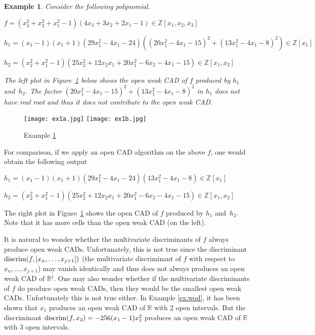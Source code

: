 \documentclass[amsthm]{elsart}
\def \RR {{\mathbb R}}
\def \ZZ {{\mathbb Z}}
\newtheorem{ex}{Example}   \renewcommand{\algorithmicrequire}{\textsf{Input:}}
\begin{document}
\begin{ex}\label{ex:1}
Consider the following polynomial. \medskip
\begin{description}[leftmargin=3em,style=nextline,itemsep=0.5em]
\item[\sf In:]   $f=(x_3^2+x_2^2+x_1^2-1)(4x_3+3x_2+2x_1-1)\in \ZZ[x_1, x_2,x_3]$
\item[\sf Out:]  $h_1 =(x_1-1)(x_1+1)(29x_1^2-4x_1-24)((20x_1^2-4x_1-15)^2+(13x_1^2-4x_1-8)^2)\in \ZZ[x_1]$
\item[]             $h_2 =(x_2^2+x_1^2-1)(25x_2^2+12x_2x_1+20x_1^2-6x_2-4x_1-15)\in \ZZ[x_1, x_2] $
\end{description} \medskip
The left plot in Figure~\ref{fig:ex1ab} below shows the open weak CAD of $f$  produced by $h_1$ and~$h_2$.
The factor $(20x_1^2-4x_1-15)^2+(13x_1^2-4x_1-8)^2$ in $h_1$ does not have real root and thus it does not contribute to the open weak CAD.
\end{ex}
\begin{figure}[h]
\begin{center}
\texttt{[image: ex1a.jpg]}
\texttt{[image: ex1b.jpg]}
\end{center}
\caption{\label{fig:ex1ab}Example \ref{ex:1} }
\end{figure}


\begin{rem} For comparison, if we apply an open CAD  algorithm on the above $f$, one would obtain the following
output\medskip
\begin{description}[leftmargin=3em,style=nextline,itemsep=0.5em]
\item[\sf Out:]  $h_1=(x_1-1)(x_1+1)(29x_1^2-4x_1-24)(13x_1^2-4x_1-8)\in \ZZ[x_1]$
\item[]          $h_2 =(x_2^2+x_1^2-1)(25x_2^2+12x_2x_1+20x_1^2-6x_2-4x_1-15)\in \ZZ[x_1, x_2]$
\end{description}  \medskip
The right plot in Figure~\ref{fig:ex1ab} shows the open  CAD of $f$  produced by $h_1$ and~$h_2$.
Note that it has more cells than the open weak CAD (on the left).
\end{rem}


\begin{rem}
It is natural to wonder whether the multivariate discriminants of $f$ always produce open weak CADs. Unfortunately, this is not true since the discriminant ${\rm discrim}(f,[x_n,\ldots,x_{j+1}])$ (the multivariate discriminant of $f$ with respect to $x_n,\ldots,x_{j+1}$) may vanish identically and thus does not always produces an open weak CAD of $\RR^j$.
One may also wonder whether if the multivariate discriminants of $f$ do produce open weak CADs, then they would be the smallest open weak CADs. Unfortunately this is not true  either. In Example \ref{ex:wod}, it has been shown that $x_1$ produces an open weak CAD of $\RR$ with $2$ open intervals. But the discriminant ${\rm discrim}(f,x_2)=-256(x_1-1)x_1^2$ produces an open weak CAD of $\RR$ with $3$ open intervals.
\end{rem}
\end{document}
